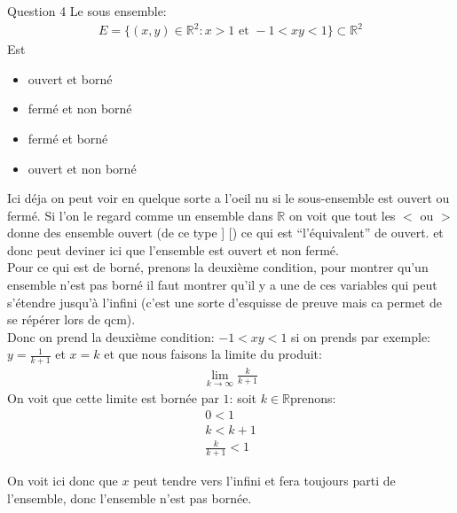 \begin{parag}{Question 4}
    Le sous ensemble:
    \begin{align*} E = \{ \left(x, y\right) \in \mathbb{R}^2: x > 1 \text{ et } -1 < xy < 1\} \subset \mathbb{R}^2 \end{align*}
    Est 
    \begin{itemize}
        \item ouvert et borné
        \item fermé et non borné
        \item fermé et borné
        \item ouvert et non borné
    \end{itemize}
    Ici déja on peut voir en quelque sorte a l'oeil nu si le sous-ensemble est ouvert ou fermé. Si l'on le regard comme un ensemble dans $\mathbb{R}$ on voit que tout les $<$ ou $>$ donne des ensemble ouvert (de ce type ] [) ce qui est ``l'équivalent'' de ouvert. et donc peut deviner ici que l'ensemble est ouvert et non fermé.\\
    Pour ce qui est de borné, prenons la deuxième condition, pour montrer qu'un ensemble n'est pas borné il faut montrer qu'il y a une de ces variables qui peut s'étendre jusqu'à l'infini (c'est une sorte d'esquisse de preuve mais ca permet de se répérer lors de qcm).\\
    Donc on prend la deuxième condition: $-1 < xy < 1$ si on prends par exemple: $y = \frac{1}{k + 1}$ et $x = k$ et que nous faisons la limite du produit:
    \begin{align*} \lim_{k \to \infty} \frac{k}{k+1} \end{align*}
    On voit que cette limite est bornée par $1$: soit $k \in \mathbb{R}$prenons:
    \begin{align*} 0 < 1\\
k < k + 1\\
\frac{k}{k+1} < 1
    \end{align*}

    On voit ici donc que $x$ peut tendre vers l'infini et fera toujours parti de l'ensemble, donc l'ensemble n'est pas bornée.

    
    
\end{parag}
